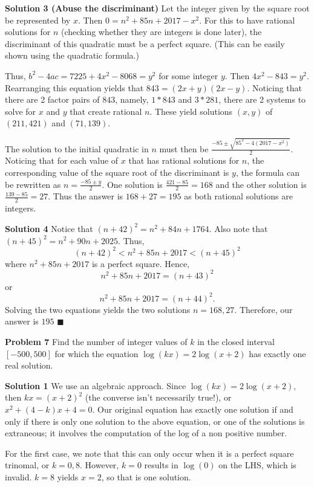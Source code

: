 \documentclass[a4paper,11pt]{article}
\begin{document}
\textbf{Solution 3 (Abuse the discriminant)}
Let the integer given by the square root be represented by $x$. Then $0 = n^2 + 85n + 2017 - x^2$. For this to have rational solutions for $n$ (checking whether they are integers is done later), the discriminant of this quadratic must be a perfect square. (This can be easily shown using the quadratic formula.)

Thus, $b^2 - 4ac = 7225 + 4x^2 - 8068 = y^2$ for some integer $y$. Then $4x^2 - 843 = y^2$. Rearranging this equation yields that $843 = (2x+y)(2x-y)$. Noticing that there are 2 factor pairs of $843$, namely, $1*843$ and $3*281$, there are 2 systems to solve for $x$ and $y$ that create rational $n$. These yield solutions $(x,y)$ of $(211, 421)$ and $(71, 139)$.

The solution to the initial quadratic in $n$ must then be $\frac{-85 \pm \sqrt{85^2 - 4(2017 - x^2)}}{2}$. Noticing that for each value of $x$ that has rational solutions for $n$, the corresponding value of the square root of the discriminant is $y$, the formula can be rewritten as $n = \frac{-85 \pm y}{2}$. One solution is $\frac{421 - 85}{2} = 168$ and the other solution is $\frac{139 - 85}{2} = 27$. Thus the answer is $168 + 27 = \boxed{195}$ as both rational solutions are integers.

\textbf{Solution 4}
Notice that $(n+42)^2= n^2+84n+1764$. Also note that $(n+45)^2= n^2+90n+2025$. Thus, \[(n+42)^2< n^2+85n+2017<(n+45)^2\] where $n^2+85n+2017$ is a perfect square. Hence,\[n^2+85n+2017= (n+43)^2\] or \[n^2+85n+2017= (n+44)^2.\] Solving the two equations yields the two solutions $n= 168, 27$. Therefore, our answer is $\boxed{195}$ \hfill $\blacksquare$

\textbf{Problem 7}
Find the number of integer values of $k$ in the closed interval $[-500,500]$ for which the equation $\log(kx)=2\log(x+2)$ has exactly one real solution.

\textbf{Solution 1}
We use an algebraic approach. Since $\log(kx)=2\log(x+2)$, then $kx = (x+2)^2$ (the converse isn't necessarily true!), or $x^2+(4-k)x+4=0$. Our original equation has exactly one solution if and only if there is only one solution to the above equation, or one of the solutions is extraneous; it involves the computation of the log of a non positive number.

For the first case, we note that this can only occur when it is a perfect square trinomal, or $k = 0, 8$. However, $k = 0$ results in $\log(0)$ on the LHS, which is invalid. $k = 8$ yields $x = 2$, so that is one solution.
\end{document}
